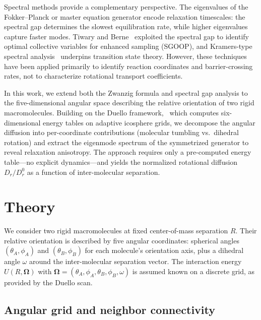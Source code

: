 \documentclass[aps,jcp,reprint,superscriptaddress]{revtex4-2}
\begin{document}
Spectral methods provide a complementary perspective.
The eigenvalues of the Fokker--Planck or master equation generator encode
relaxation timescales: the spectral gap determines the slowest equilibration
rate, while higher eigenvalues capture faster modes.
Tiwary and Berne~\cite{tiwary2016} exploited the spectral gap to identify
optimal collective variables for enhanced sampling (SGOOP),
and Kramers-type spectral analysis~\cite{kramers1940,hanggi1990,roux2022}
underpins transition state theory.
However, these techniques have been applied primarily to identify reaction
coordinates and barrier-crossing rates, not to characterize rotational
transport coefficients.

In this work, we extend both the Zwanzig formula and spectral gap analysis to
the five-dimensional angular space describing the relative orientation of two
rigid macromolecules.
Building on the Duello framework,~\cite{duello2025} which computes
six-dimensional energy tables on adaptive icosphere grids, we decompose the
angular diffusion into per-coordinate contributions (molecular tumbling vs.\
dihedral rotation) and extract the eigenmode spectrum of the symmetrized
generator to reveal relaxation anisotropy.
The approach requires only a pre-computed energy table---no explicit dynamics---and
yields the normalized rotational diffusion $D_r/D_r^0$ as a function of
inter-molecular separation.

\section{Theory}
\label{sec:theory}

We consider two rigid macromolecules at fixed center-of-mass separation $R$.
Their relative orientation is described by five angular coordinates:
spherical angles $(\theta_A, \phi_A)$ and $(\theta_B, \phi_B)$ for each
molecule's orientation axis, plus a dihedral angle $\omega$ around the
inter-molecular separation vector.
The interaction energy $U(R, \bm{\Omega})$ with
$\bm{\Omega} = (\theta_A, \phi_A, \theta_B, \phi_B, \omega)$
is assumed known on a discrete grid, as provided by the Duello
scan.~\cite{duello2025}

\subsection{Angular grid and neighbor connectivity}
\label{sec:grid}
\end{document}

